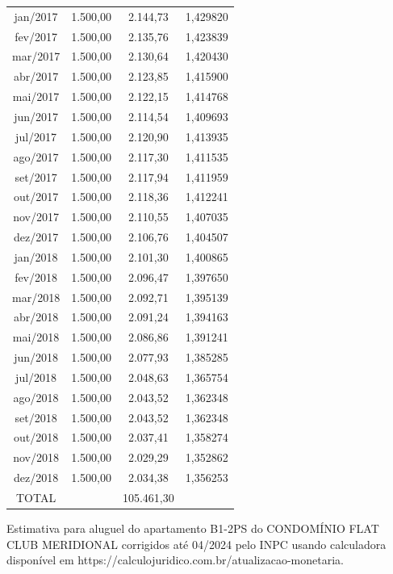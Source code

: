 \documentclass[11pt]{letter}
\begin{document}
\begin{scriptsize}
\begin{center}
\begin{tabular}{ c c c c }
jan/2017 & 1.500,00 &  2.144,73 & 1,429820 \\  
fev/2017 & 1.500,00 &  2.135,76 & 1,423839 \\
mar/2017 & 1.500,00 &  2.130,64 & 1,420430 \\
abr/2017 & 1.500,00 &  2.123,85 & 1,415900 \\
mai/2017 & 1.500,00 &  2.122,15 & 1,414768 \\
jun/2017 & 1.500,00 &  2.114,54 & 1,409693 \\
jul/2017 & 1.500,00 &  2.120,90 & 1,413935 \\
ago/2017 & 1.500,00 &  2.117,30 & 1,411535 \\
set/2017 & 1.500,00 &  2.117,94 & 1,411959 \\
out/2017 & 1.500,00 &  2.118,36 & 1,412241 \\
nov/2017 & 1.500,00 &  2.110,55 & 1,407035 \\
dez/2017 & 1.500,00 &  2.106,76 & 1,404507 \\

jan/2018 & 1.500,00 &  2.101,30 & 1,400865 \\  
fev/2018 & 1.500,00 &  2.096,47 & 1,397650 \\
mar/2018 & 1.500,00 &  2.092,71 & 1,395139 \\
abr/2018 & 1.500,00 &  2.091,24 & 1,394163 \\
mai/2018 & 1.500,00 &  2.086,86 & 1,391241 \\
jun/2018 & 1.500,00 &  2.077,93 & 1,385285 \\
jul/2018 & 1.500,00 &  2.048,63 & 1,365754 \\
ago/2018 & 1.500,00 &  2.043,52 & 1,362348 \\
set/2018 & 1.500,00 &  2.043,52 & 1,362348 \\
out/2018 & 1.500,00 &  2.037,41 & 1,358274 \\
nov/2018 & 1.500,00 &  2.029,29 & 1,352862 \\
dez/2018 & 1.500,00 &  2.034,38 & 1,356253 \\
\hline    
TOTAL & & 105.461,30 \\
\end{tabular}
\end{center}
\begin{center}
	 Estimativa para aluguel do apartamento B1-2PS do CONDOMÍNIO FLAT CLUB MERIDIONAL corrigidos até 04/2024 pelo INPC usando calculadora disponível em https://calculojuridico.com.br/atualizacao-monetaria.
\end{center}
\end{scriptsize}
\end{document}
